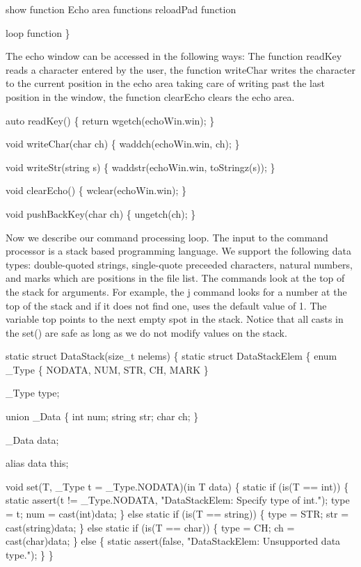   \LA{}show function\RA{}
  \LA{}Echo area functions\RA{}
  \LA{}reloadPad function\RA{}

  \LA{}loop function\RA{}
\}

\nwendcode{}The echo window can be accessed in the following ways: The function
{\Tt{}readKey\nwendquote} reads a character entered by the user, the function
{\Tt{}writeChar\nwendquote} writes the character to the current position in the echo
area taking care of writing past the last position in the window, the
function {\Tt{}clearEcho\nwendquote} clears the echo area.

\nwenddocs{}\endmoddef\nwstartdeflinemarkup\nwenddeflinemarkup
auto readKey()
\{
  return wgetch(echoWin.win);
\}

void writeChar(char ch)
\{
  waddch(echoWin.win, ch);
\}

void writeStr(string s)
\{
  waddstr(echoWin.win, toStringz(s));
\}

void clearEcho()
\{
  wclear(echoWin.win);
\}

void pushBackKey(char ch)
\{
  ungetch(ch);
\}

\nwendcode{}Now we describe our command processing loop. The input to the
command processor is a stack based programming language. We support
the following data types: double-quoted strings, single-quote
preceeded characters, natural numbers, and marks which are positions
in the file list. The commands look at the top of the stack for
arguments. For example, the {\Tt{}j\nwendquote} command looks for a number at the
top of the stack and if it does not find one, uses the default value
of 1. The variable {\Tt{}top\nwendquote} points to the next empty spot in the
stack. Notice that all casts in the {\Tt{}set()\nwendquote} are safe as long as we
do not modify values on the stack.

\nwenddocs{}\endmoddef\nwstartdeflinemarkup\nwenddeflinemarkup
static struct DataStack(size_t nelems) \{
  static struct DataStackElem \{
    enum _Type \{ NODATA, NUM, STR, CH, MARK \}

    _Type type;
  
    union _Data \{
      int num;
      string str;
      char ch;
    \}

    _Data data;
  
    alias data this;
    
    void set(T, _Type t = _Type.NODATA)(in T data) \{
      static if (is(T == int)) \{
        static assert(t != _Type.NODATA,
          "DataStackElem: Specify type of int.");
        type = t;
        num  = cast(int)data;
      \} else static if (is(T == string)) \{
        type = STR;
        str = cast(string)data;
      \} else static if (is(T == char)) \{
        type = CH;
        ch = cast(char)data;
      \} else \{
        static assert(false,
          "DataStackElem: Unsupported data type.");
      \}
    \}

